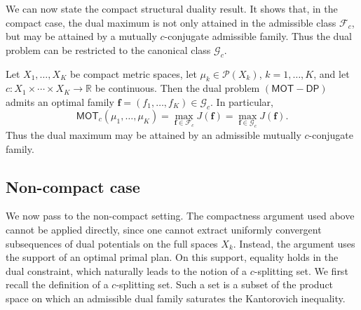 \documentclass[twoside,11pt,a4paper]{article}
\begin{document}
We can now state the compact structural duality result. It shows that, in the compact case, the dual maximum is not only attained in the admissible class \(\mathcal F_c\), but may be attained by a mutually \(c\)-conjugate admissible family. Thus the dual problem can be restricted to the canonical class \(\mathcal G_c\).



\begin{theorem}
\label{KKK}
Let \(X_1,\ldots,X_K\) be compact metric spaces, let
\(\mu_k\in\mathcal P(X_k)\), \(k=1,\ldots,K\), and let $
c:X_1\times\cdots\times X_K\longrightarrow \mathbb R$
be continuous. Then the dual problem \((\mathsf{MOT}\!-\!\mathsf{DP})\)
admits an optimal family $
\boldsymbol f=(f_1,\ldots,f_K)\in\mathcal G_c$.
In particular,
\[
\mathsf{MOT}_c(\mu_1,\ldots,\mu_K)
=
\max_{\boldsymbol f\in\mathcal F_c} J(\boldsymbol f)
=
\max_{\boldsymbol f\in\mathcal G_c} J(\boldsymbol f).
\]
Thus the dual maximum may be attained by an admissible mutually
\(c\)-conjugate family.
\end{theorem}


 



























\subsection{Non-compact case}

We now pass to the non-compact setting. The compactness argument used above cannot be applied directly, since one cannot extract uniformly convergent subsequences of dual potentials on the full spaces \(X_k\). Instead, the argument uses the support of an optimal primal plan. On this support, equality holds in the dual constraint, which naturally leads to the notion of a \(c\)-splitting set. We first recall the definition of a \(c\)-splitting set. Such a set is a subset of the product space on which an admissible dual family saturates the Kantorovich inequality.
\end{document}
